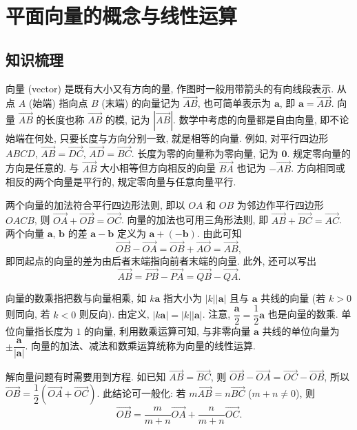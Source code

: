 
\section{平面向量的概念与线性运算}

\subsection{知识梳理}

向量 (vector) 是既有大小又有方向的量, 作图时一般用带箭头的有向线段表示. 从点 $A$ (始端) 指向点 $B$ (末端) 的向量记为 $\overrightarrow{AB}$, 也可简单表示为 $\bm{a}$, 即 $\bm{a}=\overrightarrow{AB}$. 向量 $\overrightarrow{AB}$ 的长度也称 $\overrightarrow{AB}$ 的模, 记为 $|\overrightarrow{AB}|$. 数学中考虑的向量都是自由向量, 即不论始端在何处, 只要长度与方向分别一致, 就是相等的向量. 例如, 对平行四边形 $ABCD$, $\overrightarrow{AB}= \overrightarrow{DC}$, $\overrightarrow{AD}= \overrightarrow{BC}$. 长度为零的向量称为零向量, 记为 $\bm{0}$. 规定零向量的方向是任意的. 与 $\overrightarrow{AB}$ 大小相等但方向相反的向量 $\overrightarrow{BA}$ 也记为 $-\overrightarrow{AB}$.
方向相同或相反的两个向量是平行的, 规定零向量与任意向量平行.

两个向量的加法符合平行四边形法则, 即以 $OA$ 和 $OB$ 为邻边作平行四边形 $OACB$, 则 $\overrightarrow{OA}+\overrightarrow{OB}= \overrightarrow{OC}$. 向量的加法也可用三角形法则, 即 $\overrightarrow{AB}+\overrightarrow{BC}= \overrightarrow{AC}$. 两个向量 $\bm{a}$, $\bm{b}$ 的差 $\bm{a}-\bm{b}$ 定义为 $\bm{a}+(-\bm{b})$. 由此可知
\[\overrightarrow{OB}-\overrightarrow{OA}
    = \overrightarrow{OB}+\overrightarrow{AO}
    = \overrightarrow{AB},\]
即同起点的向量的差为由后者末端指向前者末端的向量. 此外, 还可以写出
\[\overrightarrow{AB}
    = \overrightarrow{PB}-\overrightarrow{PA}
    = \overrightarrow{QB}-\overrightarrow{QA}.\]

向量的数乘指把数与向量相乘, 如 $k\bm{a}$ 指大小为 $|k||\bm{a}|$ 
且与 $\bm{a}$ 共线的向量 (若 $k>0$ 则同向, 若 $k<0$ 则反向).
由定义, $|k\bm{a}|=|k||\bm{a}|$. 注意, $\dfrac{\bm{a}}2= \dfrac12\bm{a}$ 也是向量的数乘. 单位向量指长度为 $1$ 的向量, 利用数乘运算可知, 
与非零向量 $\bm{a}$ 共线的单位向量为 $\pm\dfrac{\bm{a}}{|\bm{a}|}$.
向量的加法、减法和数乘运算统称为向量的线性运算.

解向量问题有时需要用到方程. 如已知 $\overrightarrow{AB}=\overrightarrow{BC}$, 则 $\overrightarrow{OB}- \overrightarrow{OA}
    = \overrightarrow{OC}- \overrightarrow{OB}$,
所以 $\overrightarrow{OB}= \dfrac12(\overrightarrow{OA}+\overrightarrow{OC})$. 此结论可一般化: 若 $m\overrightarrow{AB}=n\overrightarrow{BC}$ ($m+n\neq0$), 则 
\[\overrightarrow{OB}= \dfrac{m}{m+n}\overrightarrow{OA}
    +\dfrac{n}{m+n}\overrightarrow{OC}.\]

